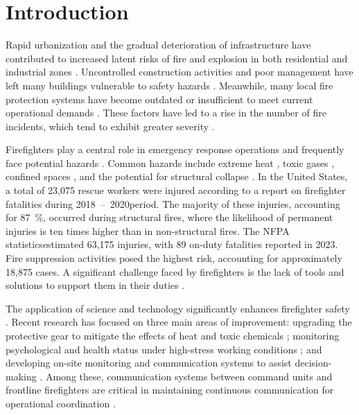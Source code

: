 \documentclass[journal,twoside,web]{ieeecolor}
\begin{document}
\maketitle
\section{Introduction}
\label{sec:introduction}

Rapid urbanization and the gradual deterioration of infrastructure have contributed to increased latent risks of fire and explosion in both residential and industrial zones \cite{Clarke2021firefighter}.
Uncontrolled construction activities and poor management have left many buildings vulnerable to safety hazards \cite{Fialho_Fire2024}. Meanwhile, many local fire protection systems have become outdated or insufficient to meet current operational demands \cite{Rosengren_FIRE2014}. These factors have led to a rise in the number of fire incidents, which tend to exhibit greater severity \cite{Fialho_Fire2024}.

Firefighters play a central role in emergency response operations and frequently face potential hazards \cite{FirefighterImportant2022}.
Common hazards include extreme heat \cite{Firefighterhealthcare2024}, toxic gases \cite{Firefighter_toxis}, confined spaces \cite{Firefighter_limited2019}, and the potential for structural collapse \cite{Firefigter_toxis_2016}. In the United States, a total of 23,075 rescue workers were injured according to a report on firefighter fatalities during 2018~--~2020\footnotemark[1] period. The majority of these injuries, accounting for 87~\%, occurred during structural fires, where the likelihood of permanent injuries is ten times higher than in non-structural fires. The NFPA statistics\footnotemark[2] estimated 63,175 injuries, with 89 on-duty fatalities reported in 2023. Fire suppression activities posed the highest risk, accounting for approximately 18,875 cases. A significant challenge faced by firefighters is the lack of tools and solutions to support them in their duties \cite{carmona2024firefighters,FirefighterClothing2022,Thanhfire2019,Firefighter_Falling_2023}.


The application of science and technology significantly enhances firefighter safety \cite{Firefighter_limited2019,FirefighterImportant2022,carmona2024firefighters}. Recent research has focused on three main areas of improvement: upgrading the protective gear to mitigate the effects of heat and toxic chemicals \cite{FirefighterClothing2022, Firefighter_toxis}; monitoring psychological and health status under high-stress working conditions \cite{Firefighterhealthcare2024, Rosengren_FIRE2014}; and developing on-site monitoring and communication systems to assist decision-making \cite{FirefighterImportant2022,Thanhfire2019, Firefighter_Falling_2023}.
Among these, communication systems between command units and frontline firefighters are critical in maintaining continuous communication for operational coordination \cite{Rosing04032022, Takacs2022}.
\end{document}
